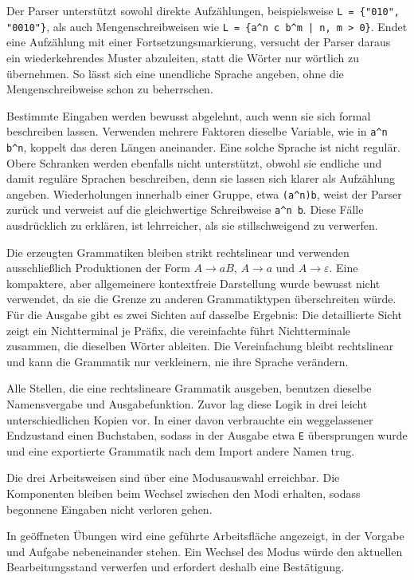 Der Parser unterstützt sowohl direkte Aufzählungen, beispielsweise
\verb|L = {"010", "0010"}|, als auch Mengenschreibweisen wie
\verb+L = {a^n c b^m | n, m > 0}+. Endet eine Aufzählung mit einer
Fortsetzungsmarkierung, versucht der Parser daraus ein wiederkehrendes Muster
abzuleiten, statt die Wörter nur wörtlich zu übernehmen.
So lässt sich eine unendliche Sprache angeben, ohne die Mengenschreibweise schon zu
beherrschen.

Bestimmte Eingaben werden bewusst abgelehnt, auch wenn sie sich formal beschreiben
lassen.
Verwenden mehrere Faktoren dieselbe Variable, wie in \verb|a^n b^n|, koppelt das
deren Längen aneinander. Eine solche Sprache ist nicht regulär.
Obere Schranken werden ebenfalls nicht unterstützt, obwohl sie endliche und damit
reguläre Sprachen beschreiben, denn sie lassen sich klarer als Aufzählung angeben.
Wiederholungen innerhalb einer Gruppe, etwa \verb|(a^n)b|, weist der Parser zurück
und verweist auf die gleichwertige Schreibweise \verb|a^n b|. Diese Fälle
ausdrücklich zu erklären, ist lehrreicher, als sie stillschweigend zu verwerfen.

Die erzeugten Grammatiken bleiben strikt rechtslinear und verwenden ausschließlich
Produktionen der Form $A \rightarrow aB$, $A \rightarrow a$ und
$A \rightarrow \varepsilon$. Eine kompaktere, aber allgemeinere kontextfreie
Darstellung wurde bewusst nicht verwendet, da sie die Grenze zu anderen
Grammatiktypen überschreiten würde.
Für die Ausgabe gibt es zwei Sichten auf dasselbe Ergebnis: Die detaillierte Sicht
zeigt ein Nichtterminal je Präfix, die vereinfachte führt Nichtterminale zusammen,
die dieselben Wörter ableiten.
Die Vereinfachung bleibt rechtslinear und kann die Grammatik nur verkleinern, nie
ihre Sprache verändern.

Alle Stellen, die eine rechtslineare Grammatik ausgeben, benutzen dieselbe
Namensvergabe und Ausgabefunktion.
Zuvor lag diese Logik in drei leicht unterschiedlichen Kopien vor. In einer davon
verbrauchte ein weggelassener Endzustand einen Buchstaben, sodass in der Ausgabe etwa
\verb|E| übersprungen wurde und eine exportierte Grammatik nach dem Import andere
Namen trug.


Die drei Arbeitsweisen sind über eine Modusauswahl erreichbar.
Die Komponenten bleiben beim Wechsel zwischen den Modi erhalten, sodass begonnene
Eingaben nicht verloren gehen.

In geöffneten Übungen wird eine geführte Arbeitsfläche angezeigt, in der Vorgabe und
Aufgabe nebeneinander stehen.
Ein Wechsel des Modus würde den aktuellen Bearbeitungsstand verwerfen und erfordert
deshalb eine Bestätigung.


